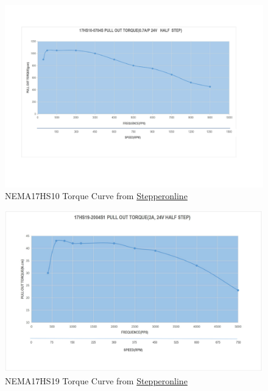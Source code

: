 \documentclass[a4paper,12pt]{article}
\begin{document}
\begin{figure}[H]
    \begin{center}
        \includegraphics[width=14cm]{images/17HS10-0704S_Torque_Curve.pdf}
        \caption{NEMA17HS10 Torque Curve from \href{http://www.omc-stepperonline.com}{Stepperonline}}
        \label{fig:NEMA17HS10torque}
    \end{center}
\end{figure}
\begin{figure}[H]
    \begin{center}
        \includegraphics[width=14cm]{images/17HS19-2004S1_Torque_Curve.pdf}
        \caption{NEMA17HS19 Torque Curve from \href{http://www.omc-stepperonline.com}{Stepperonline}}
        \label{fig:NEMA17HS19torque}
    \end{center}
\end{figure}
\end{document}
